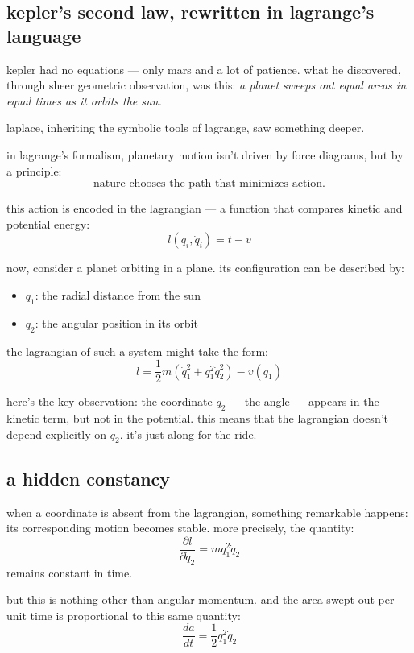     \subsection{kepler’s second law, rewritten in lagrange’s language}

kepler had no equations — only mars and a lot of patience.  
what he discovered, through sheer geometric observation, was this:  
\textit{a planet sweeps out equal areas in equal times as it orbits the sun.}

laplace, inheriting the symbolic tools of lagrange, saw something deeper.

\medskip

in lagrange’s formalism, planetary motion isn’t driven by force diagrams, but by a principle:
\[
\text{nature chooses the path that minimizes action.}
\]

this action is encoded in the lagrangian — a function that compares kinetic and potential energy:
\[
l(q_i, \dot{q}_i) = t - v
\]

now, consider a planet orbiting in a plane. its configuration can be described by:
\begin{itemize}
    \item \( q_1 \): the radial distance from the sun
    \item \( q_2 \): the angular position in its orbit
\end{itemize}

the lagrangian of such a system might take the form:
\[
l = \frac{1}{2} m \left( \dot{q}_1^2 + q_1^2 \dot{q}_2^2 \right) - v(q_1)
\]

here’s the key observation: the coordinate \( q_2 \) — the angle — appears in the kinetic term, but not in the potential.  
this means that the lagrangian doesn’t depend explicitly on \( q_2 \). it’s just along for the ride.

\subsection{a hidden constancy}

when a coordinate is absent from the lagrangian, something remarkable happens: its corresponding motion becomes stable.  
more precisely, the quantity:
\[
\frac{\partial l}{\partial \dot{q}_2} = m q_1^2 \dot{q}_2
\]
remains constant in time.

but this is nothing other than angular momentum. and the area swept out per unit time is proportional to this same quantity:
\[
\frac{da}{dt} = \frac{1}{2} q_1^2 \dot{q}_2
\]

